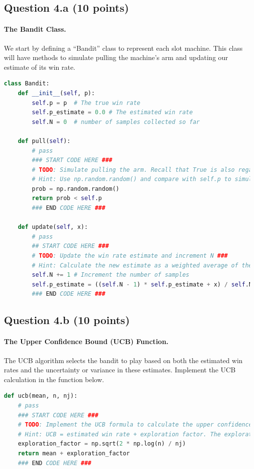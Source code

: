 \documentclass[12pt]{article}
\begin{document}
\subsection*{Question 4.a (10 points) } 
\paragraph{The Bandit Class.} We start by defining a ``Bandit'' class to represent each slot machine. This class will have methods to simulate pulling the machine's arm and updating our estimate of its win rate.

\begin{solution}
\begin{lstlisting}[language=Python]
class Bandit:
    def __init__(self, p):
        self.p = p  # The true win rate
        self.p_estimate = 0.0 # The estimated win rate
        self.N = 0  # number of samples collected so far
    
    def pull(self):
        # pass
        ### START CODE HERE ###
        # TODO: Simulate pulling the arm. Recall that True is also regarded as 1 and False is regarded as 0 ###
        # Hint: Use np.random.random() and compare with self.p to simulate a dense probability distribution
        prob = np.random.random()
        return prob < self.p
        ### END CODE HERE ###
    
    def update(self, x):
        # pass
        ## START CODE HERE ###
        # TODO: Update the win rate estimate and increment N ###
        # Hint: Calculate the new estimate as a weighted average of the old estimate and the new sample `x`
        self.N += 1 # Increment the number of samples
        self.p_estimate = ((self.N - 1) * self.p_estimate + x) / self.N
        ### END CODE HERE ###

\end{lstlisting}
\end{solution}

\subsection*{Question 4.b (10 points) } 
\paragraph{The Upper Confidence Bound (UCB) Function.}
The UCB algorithm selects the bandit to play based on both the estimated win rates and the uncertainty or variance in these estimates. Implement the UCB calculation in the function below.
\begin{solution}
\begin{lstlisting}[language=Python]
def ucb(mean, n, nj):
    # pass
    ### START CODE HERE ###
    # TODO: Implement the UCB formula to calculate the upper confidence bound ###
    # Hint: UCB = estimated win rate + exploration factor. The exploration factor can be calculated using np.sqrt(2 * np.log(n) / nj)
    exploration_factor = np.sqrt(2 * np.log(n) / nj)
    return mean + exploration_factor
    ### END CODE HERE ###
\end{lstlisting}
\end{solution}
\end{document}
